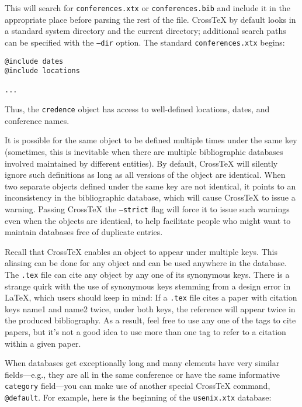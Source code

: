 \documentclass{article}
\newcommand{\XTeX}{Cross\TeX}
\begin{document}
This will search for \texttt{conferences.xtx} or \texttt{conferences.bib} and include it in the appropriate place before parsing the rest of the file. \XTeX{} by default looks in a standard system directory and the current directory; additional search paths can be specified with the \texttt{--dir} option. The standard \texttt{conferences.xtx} begins:

\begin{small}\begin{verbatim}
@include dates
@include locations

...
\end{verbatim}\end{small}

Thus, the \texttt{credence} object has access to well-defined locations, dates, and conference names.

It is possible for the same object to be defined multiple times under the 
same key (sometimes, this is inevitable when there are multiple bibliographic
databases involved maintained by different entities). By default, \XTeX{}
will silently ignore such definitions as long as all versions of the object
are identical. When two separate objects defined under the same key are not
identical, it points to an inconsistency in the bibliographic database, which
will cause \XTeX{} to issue a warning. Passing \XTeX{} the \texttt{--strict} flag will force it to issue such warnings even when the objects are identical,
to help facilitate people who might want to maintain databases free of
duplicate entries.

Recall that \XTeX{} enables an object to appear under multiple keys. 
This aliasing can be done for any object and can be used anywhere in
the database. The \texttt{.tex} file can cite any object by any one of
its synonymous keys. There is a strange quirk with the use of
synonymous keys stemming from a design error in LaTeX, which users
should keep in mind: If a \texttt{.tex} file cites a paper with
citation keys name1 and name2 twice, under both keys, the reference
will appear twice in the produced bibliography. As a result, feel free
to use any one of the tags to cite papers, but it's not a good idea to
use more than one tag to refer to a citation within a given paper.

When databases get exceptionally long and many elements have very similar fields---e.g., they are all in the same conference or have the same informative \texttt{category} field---you can make use of another special \XTeX{} command, \texttt{@default}. For example, here is the beginning of the \texttt{usenix.xtx} database:
\end{document}

